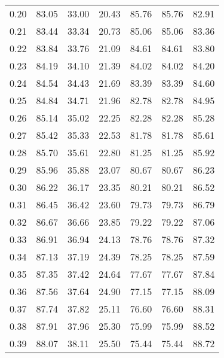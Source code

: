 \begin{tabular}{|c|c|c|c|c|c|c|}
      0.20 &     83.05 &     33.00 &      20.43 &   85.76 &      85.76 &         82.91 \\
      0.21 &     83.44 &     33.34 &      20.73 &   85.06 &      85.06 &         83.36 \\
      0.22 &     83.84 &     33.76 &      21.09 &   84.61 &      84.61 &         83.80 \\
      0.23 &     84.19 &     34.10 &      21.39 &   84.02 &      84.02 &         84.20 \\
      0.24 &     84.54 &     34.43 &      21.69 &   83.39 &      83.39 &         84.60 \\
      0.25 &     84.84 &     34.71 &      21.96 &   82.78 &      82.78 &         84.95 \\
      0.26 &     85.14 &     35.02 &      22.25 &   82.28 &      82.28 &         85.28 \\
      0.27 &     85.42 &     35.33 &      22.53 &   81.78 &      81.78 &         85.61 \\
      0.28 &     85.70 &     35.61 &      22.80 &   81.25 &      81.25 &         85.92 \\
      0.29 &     85.96 &     35.88 &      23.07 &   80.67 &      80.67 &         86.23 \\
      0.30 &     86.22 &     36.17 &      23.35 &   80.21 &      80.21 &         86.52 \\
      0.31 &     86.45 &     36.42 &      23.60 &   79.73 &      79.73 &         86.79 \\
      0.32 &     86.67 &     36.66 &      23.85 &   79.22 &      79.22 &         87.06 \\
      0.33 &     86.91 &     36.94 &      24.13 &   78.76 &      78.76 &         87.32 \\
      0.34 &     87.13 &     37.19 &      24.39 &   78.25 &      78.25 &         87.59 \\
      0.35 &     87.35 &     37.42 &      24.64 &   77.67 &      77.67 &         87.84 \\
      0.36 &     87.56 &     37.64 &      24.90 &   77.15 &      77.15 &         88.09 \\
      0.37 &     87.74 &     37.82 &      25.11 &   76.60 &      76.60 &         88.31 \\
      0.38 &     87.91 &     37.96 &      25.30 &   75.99 &      75.99 &         88.52 \\
      0.39 &     88.07 &     38.11 &      25.50 &   75.44 &      75.44 &         88.72 \\

\end{tabular}
